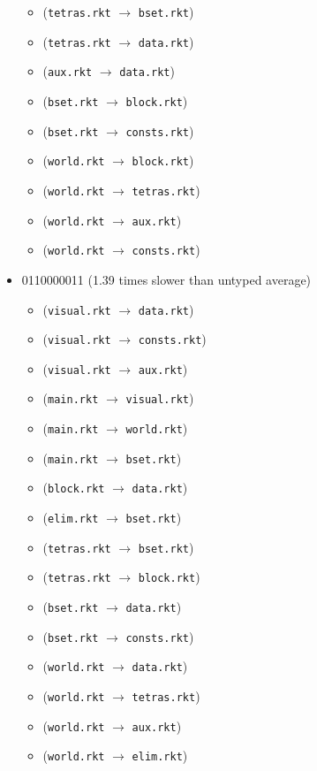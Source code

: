 \documentclass{article}
\newcommand{\mono}[1]{\texttt{#1}}
\begin{document}
\begin{itemize}
\begin{itemize}
  \item (\mono{tetras.rkt} $\rightarrow$ \mono{bset.rkt})
  \item (\mono{tetras.rkt} $\rightarrow$ \mono{data.rkt})
  \item (\mono{aux.rkt} $\rightarrow$ \mono{data.rkt})
  \item (\mono{bset.rkt} $\rightarrow$ \mono{block.rkt})
  \item (\mono{bset.rkt} $\rightarrow$ \mono{consts.rkt})
  \item (\mono{world.rkt} $\rightarrow$ \mono{block.rkt})
  \item (\mono{world.rkt} $\rightarrow$ \mono{tetras.rkt})
  \item (\mono{world.rkt} $\rightarrow$ \mono{aux.rkt})
  \item (\mono{world.rkt} $\rightarrow$ \mono{consts.rkt})
  \end{itemize}
\item 0110000011 (1.39 times slower than untyped average)
  \begin{itemize}
  \item (\mono{visual.rkt} $\rightarrow$ \mono{data.rkt})
  \item (\mono{visual.rkt} $\rightarrow$ \mono{consts.rkt})
  \item (\mono{visual.rkt} $\rightarrow$ \mono{aux.rkt})
  \item (\mono{main.rkt} $\rightarrow$ \mono{visual.rkt})
  \item (\mono{main.rkt} $\rightarrow$ \mono{world.rkt})
  \item (\mono{main.rkt} $\rightarrow$ \mono{bset.rkt})
  \item (\mono{block.rkt} $\rightarrow$ \mono{data.rkt})
  \item (\mono{elim.rkt} $\rightarrow$ \mono{bset.rkt})
  \item (\mono{tetras.rkt} $\rightarrow$ \mono{bset.rkt})
  \item (\mono{tetras.rkt} $\rightarrow$ \mono{block.rkt})
  \item (\mono{bset.rkt} $\rightarrow$ \mono{data.rkt})
  \item (\mono{bset.rkt} $\rightarrow$ \mono{consts.rkt})
  \item (\mono{world.rkt} $\rightarrow$ \mono{data.rkt})
  \item (\mono{world.rkt} $\rightarrow$ \mono{tetras.rkt})
  \item (\mono{world.rkt} $\rightarrow$ \mono{aux.rkt})
  \item (\mono{world.rkt} $\rightarrow$ \mono{elim.rkt})

\end{itemize}
\end{itemize}
\end{document}
